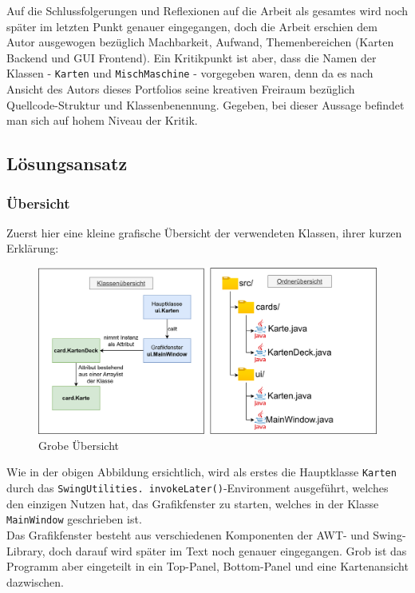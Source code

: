 \documentclass[a4paper,11pt]{article}
\begin{document}
Auf die Schlussfolgerungen und Reflexionen auf die Arbeit als gesamtes wird noch später im letzten Punkt genauer eingegangen, doch die Arbeit erschien dem Autor ausgewogen bezüglich Machbarkeit, Aufwand, Themenbereichen (Karten Backend und GUI Frontend). Ein Kritikpunkt ist aber, dass die Namen der Klassen - \texttt{Karten} und \texttt{MischMaschine} - vorgegeben waren, denn da es nach Ansicht des Autors dieses Portfolios seine kreativen Freiraum bezüglich Quellcode-Struktur und Klassenbenennung. Gegeben, bei dieser Aussage befindet man sich auf hohem Niveau der Kritik.

\subsection{Lösungsansatz}

\subsubsection{Übersicht}

Zuerst hier eine kleine grafische Übersicht der verwendeten Klassen, ihrer kurzen Erklärung:

\begin{figure}[H]
    \centering
    \includegraphics[width=\textwidth]{media/class-overview.png}
    \caption{Grobe Übersicht}
\end{figure}

Wie in der obigen Abbildung ersichtlich, wird als erstes die Hauptklasse \texttt{Karten} durch das \texttt{SwingUtilities.
invokeLater()}-Environment ausgeführt, welches den einzigen Nutzen hat, das Grafikfenster zu starten, welches in der Klasse \texttt{MainWindow} geschrieben ist.\\

Das Grafikfenster besteht aus verschiedenen Komponenten der AWT- und Swing-Library, doch darauf wird später im Text noch genauer eingegangen. Grob ist das Programm aber eingeteilt in ein Top-Panel, Bottom-Panel und eine Kartenansicht dazwischen.\\
\end{document}
